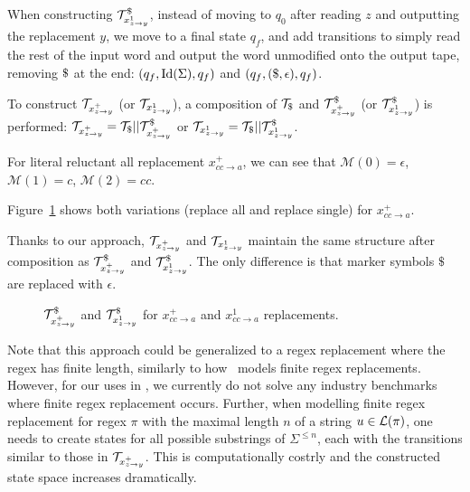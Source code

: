 When constructing $\mathcal{T}^\$_{x^{1}_{z \rightarrow y}}$, instead of moving to $q_0$ after reading $z$ and outputting the replacement $y$, we move to a final state $q_f$, and add transitions to simply read the rest of the input word and output the word unmodified onto the output tape, removing $\marker$ at the end: $(q_f, \text{Id}(\Sigma), q_f)$ and $(q_f, (\$, \epsilon), q_f)$.

To construct $\mathcal{T}_{x^{+}_{z \rightarrow y}}$ (or $\mathcal{T}_{x^{1}_{z \rightarrow y}}$), a composition of $\ft_\marker$ and $\mathcal{T}^\$_{x^{+}_{z \rightarrow y}}$ (or $\mathcal{T}^\$_{x^{1}_{z \rightarrow y}}$) is performed: $\mathcal{T}_{x^{+}_{z \rightarrow y}} = \mathcal{T}_\$ || \mathcal{T}^\$_{x^{+}_{z \rightarrow y}}$ or $\mathcal{T}_{x^{1}_{z \rightarrow y}} = \mathcal{T}_\$ || \mathcal{T}^\$_{x^{1}_{z \rightarrow y}}$.

\begin{example}
  For literal reluctant all replacement $x^{+}_{cc  \rightarrow a}$, we can see that $\mathcal{M}(0) = \epsilon$, $\mathcal{M}(1) = c$, $\mathcal{M}(2) = cc$.

  Figure~\ref{fig:literal_reluctant_replace} shows both variations (replace all and replace single) \nfts for $x^{+}_{cc \rightarrow a}$.

  Thanks to our approach, $\mathcal{T}_{x^{+}_{z \rightarrow y}}$ and $\mathcal{T}_{x^{1}_{z \rightarrow y}}$ maintain the same structure after composition as $\mathcal{T}^\$_{x^{+}_{z \rightarrow y}}$ and $\mathcal{T}^\$_{x^{1}_{z \rightarrow y}}$.
  The only difference is that marker symbols $\$$ are replaced with $\epsilon$.

\begin{figure}[ht]
    \centering
    \quad
    \caption{
      $\mathcal{T}^\$_{x^{+}_{z \rightarrow y}}$ and $\mathcal{T}^\$_{x^{1}_{z \rightarrow y}}$ for $x^{+}_{cc \rightarrow a}$ and $x^{1}_{cc \rightarrow a}$ replacements.
    }
    \label{fig:literal_reluctant_replace}%
\end{figure}

\end{example}

Note that this approach could be generalized to a regex replacement where the regex has finite length, similarly to how~\cite{replace_nfts_model_ModelingRegularReplacementForStringConstraintSolving_DBLP:conf/nfm/FuL10} models finite regex replacements.
However, for our uses in \noodler, we currently do not solve any industry benchmarks where finite regex replacement occurs.
Further, when modelling finite regex replacement for regex $\pi$ with the maximal length $n$ of a string $u \in \mathcal{L}(\pi)$, one needs to create states for all possible substrings of $\Sigma^{\leq n}$, each with the transitions similar to those in $\mathcal{T}_{x^{+}_{z \rightarrow y}}$.
This is computationally costrly and the constructed state space increases dramatically.

